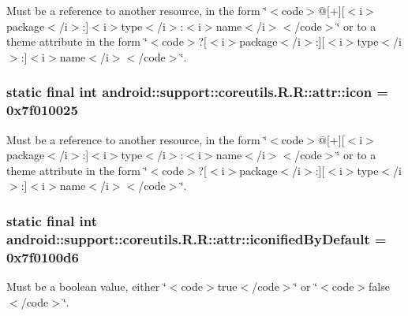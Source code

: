 Must be a reference to another resource, in the form \char`\"{}$<$code$>$@\mbox{[}+\mbox{]}\mbox{[}$<$i$>$package$<$/i$>$:\mbox{]}$<$i$>$type$<$/i$>$:$<$i$>$name$<$/i$>$$<$/code$>$\char`\"{} or to a theme attribute in the form \char`\"{}$<$code$>$?\mbox{[}$<$i$>$package$<$/i$>$:\mbox{]}\mbox{[}$<$i$>$type$<$/i$>$:\mbox{]}$<$i$>$name$<$/i$>$$<$/code$>$\char`\"{}. \hypertarget{classandroid_1_1support_1_1coreutils_1_1_r_1_1attr_8570e803a076dfcc8b6e52a56a78636b}{
\subsubsection[{icon}]{\setlength{\rightskip}{0pt plus 5cm}static final int android::support::coreutils.R.R::attr::icon = 0x7f010025}}
\label{classandroid_1_1support_1_1coreutils_1_1_r_1_1attr_8570e803a076dfcc8b6e52a56a78636b}


Must be a reference to another resource, in the form \char`\"{}$<$code$>$@\mbox{[}+\mbox{]}\mbox{[}$<$i$>$package$<$/i$>$:\mbox{]}$<$i$>$type$<$/i$>$:$<$i$>$name$<$/i$>$$<$/code$>$\char`\"{} or to a theme attribute in the form \char`\"{}$<$code$>$?\mbox{[}$<$i$>$package$<$/i$>$:\mbox{]}\mbox{[}$<$i$>$type$<$/i$>$:\mbox{]}$<$i$>$name$<$/i$>$$<$/code$>$\char`\"{}. \hypertarget{classandroid_1_1support_1_1coreutils_1_1_r_1_1attr_d6fa93c51a0f1e9105e089e70a49cf5a}{
\subsubsection[{iconifiedByDefault}]{\setlength{\rightskip}{0pt plus 5cm}static final int android::support::coreutils.R.R::attr::iconifiedByDefault = 0x7f0100d6}}
\label{classandroid_1_1support_1_1coreutils_1_1_r_1_1attr_d6fa93c51a0f1e9105e089e70a49cf5a}


Must be a boolean value, either \char`\"{}$<$code$>$true$<$/code$>$\char`\"{} or \char`\"{}$<$code$>$false$<$/code$>$\char`\"{}. 


